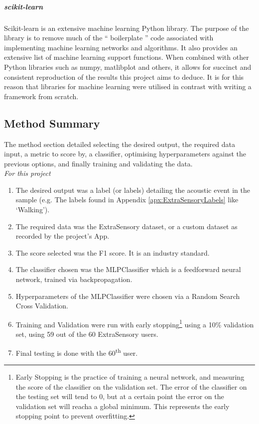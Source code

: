 \documentclass{UoNMCHA}
\newcommand{\inlineQuote}[1]{`` #1 ''}
\newcommand{\aref}[1] {Appendix \ref{#1}}
\numberwithin{equation}{section}
\begin{document}
\subparagraph{scikit-learn}
Scikit-learn is an extensive machine learning Python library. The purpose of the library is to remove much of the \inlineQuote{boilerplate} code associated with implementing machine learning networks and algorithms. It also provides an extensive list of machine learning support functions.
When combined with other Python libraries such as numpy, matlibplot and others, it allows for succinct and consistent reproduction of the results this project aims to deduce. It is for this reason that libraries for machine learning were utilised in contrast with writing a framework from scratch.

\subsection{Method Summary}
The method section detailed selecting the desired output, the required data input, a metric to score by, a classifier, optimising hyperparameters against the previous options, and finally training and validating the data. \\

{\itshape For this project}
\begin{enumerate}
    \item The desired output was a label (or labels) detailing the acoustic event in the sample (e.g. The labels found in \aref{apx:ExtraSensoryLabels} like `Walking').
    \item The required data was the ExtraSensory dataset, or a custom dataset as recorded by the project's App.
    \item The score selected was the F1 score. It is an industry standard.
    \item The classifier chosen was the MLPClassifier which is a feedforward neural network, trained via backpropagation.
    \item Hyperparameters of the MLPClassifier were chosen via a Random Search Cross Validation.
    \item Training and Validation were run with early stopping\footnote{Early Stopping is the practice of training a neural network, and measuring the score of the classifier on the validation set. The error of the classifier on the testing set will tend to 0, but at a certain point the error on the validation set will reacha a global minimum. This represents the early stopping point to prevent overfitting.} using a 10\% validation set, using 59 out of the 60 ExtraSensory users.
    \item Final testing is done with the 60\textsuperscript{th} user.
\end{enumerate}
\end{document}
